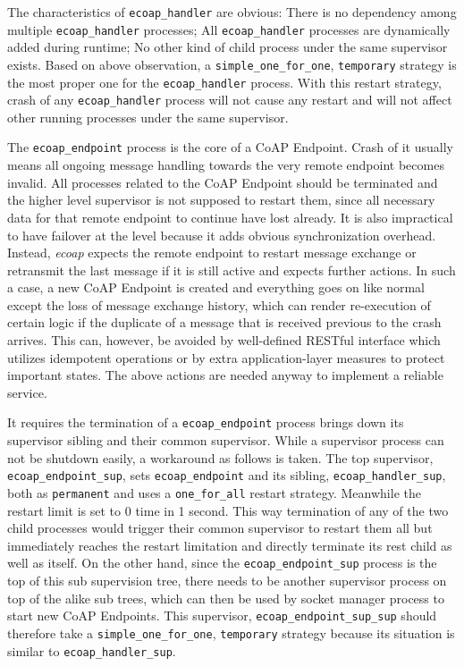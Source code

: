 The characteristics of \verb|ecoap_handler| are obvious: There is no dependency among multiple \verb|ecoap_handler| processes; All \verb|ecoap_handler| processes are dynamically added during runtime; No other kind of child process under the same supervisor exists. Based on above observation, a  \verb|simple_one_for_one|, \verb|temporary| strategy is the most proper one for the \verb|ecoap_handler| process. With this restart strategy, crash of any \verb|ecoap_handler| process will not cause any restart and will not affect other running processes under the same supervisor.

The \verb|ecoap_endpoint| process is the core of a CoAP Endpoint. Crash of it usually means all ongoing message handling towards the very remote endpoint becomes invalid. All processes related to the CoAP Endpoint should be terminated and the higher level supervisor is not supposed to restart them, since all necessary data for that remote endpoint to continue have lost already. It is also impractical to have failover at the level because it adds obvious synchronization overhead. Instead, \textit{ecoap} expects the remote endpoint to restart message exchange or retransmit the last message if it is still active and expects further actions. In such a case, a new CoAP Endpoint is created and everything goes on like normal except the loss of message exchange history, which can render re-execution of certain logic if the duplicate of a message that is received previous to the crash arrives. This can, however, be avoided by well-defined RESTful interface which utilizes idempotent operations or by extra application-layer measures to protect important states. The above actions are needed anyway to implement a reliable service.

It requires the termination of a \verb|ecoap_endpoint| process brings down its supervisor sibling and their common supervisor. While a supervisor process can not be shutdown easily, a workaround as follows is taken. The top supervisor, \verb|ecoap_endpoint_sup|, sets \verb|ecoap_endpoint| and its sibling, \verb|ecoap_handler_sup|, both as \verb|permanent| and uses a \verb|one_for_all| restart strategy. Meanwhile the restart limit is set to 0 time in 1 second. This way termination of any of the two child processes would trigger their common supervisor to restart them all but immediately reaches the restart limitation and directly terminate its rest child as well as itself. On the other hand, since the \verb|ecoap_endpoint_sup| process is the top of this sub supervision tree, there needs to be another supervisor process on top of the alike sub trees, which can then be used by socket manager process to start new CoAP Endpoints. This supervisor, \verb|ecoap_endpoint_sup_sup| should therefore take a \verb|simple_one_for_one|, \verb|temporary| strategy because its situation is similar to \verb|ecoap_handler_sup|. 


